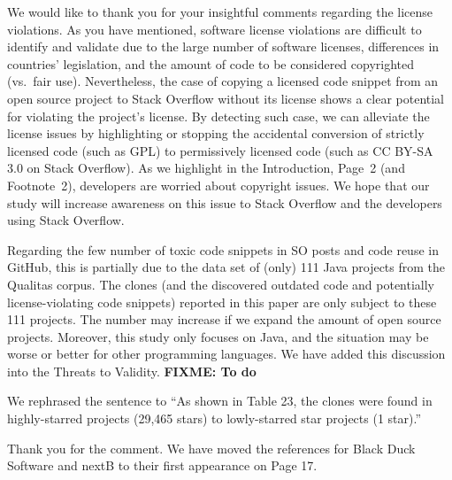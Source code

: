 \documentclass[a4paper,twoside,10pt]{reviewresponse}
\newcommand\FIXME[1]{{\color{red}\textbf{FIXME: #1}}}
\begin{document}
We would like to thank you for your insightful comments regarding the license violations. As you have mentioned, software license violations are difficult to identify and validate due to the large number of software licenses, differences in countries' legislation, and the amount of code to be considered copyrighted (vs.~fair use). Nevertheless, the case of copying a licensed code snippet from an open source project to Stack Overflow without its license shows a clear potential for violating the project's license. By detecting such case, we can alleviate the license issues by highlighting or stopping the accidental conversion of strictly licensed code (such as GPL) to permissively licensed code (such as CC BY-SA 3.0 on Stack Overflow). As we highlight in the Introduction, Page~2 (and Footnote~2), developers are worried about copyright issues. We hope that our study will increase awareness on this issue to Stack Overflow and the developers using Stack Overflow.

Regarding the few number of toxic code snippets in SO posts and code reuse in GitHub, this is partially due to the data set of (only) 111 Java projects from the Qualitas corpus. The clones (and the discovered outdated code and potentially license-violating code snippets) reported in this paper are only subject to these 111 projects. The number may increase if we expand the amount of open source projects. Moreover, this study only focuses on Java, and the situation may be worse or better for other programming languages. We have added this discussion into the Threats to Validity. \FIXME{To do}


We rephrased the sentence to ``As shown in Table 23, the clones were found in highly-starred projects (29,465 stars) to lowly-starred star projects (1 star).''


Thank you for the comment. We have moved the references for Black Duck Software and nextB to their first appearance on Page 17.
\end{document}
